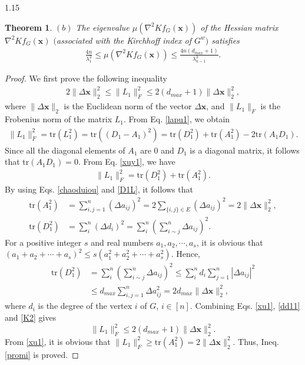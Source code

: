 \documentclass[preprint,12pt]{elsarticle1}
\newtheorem{thm}{Theorem}[section]
\numberwithin{equation}{section}
\begin{document}
\begin{spacing}{1.15}
\begin{thm}
$(b)$  The eigenvalue $\mu(\nabla^{2}Kf_{G}(\mathbf{x}))$ of the Hessian matrix $\nabla^{2}Kf_{G}(\mathbf{x})$ $($associated with the Kirchhoff index  of $G^{w}$$)$ satisfies
\begin{align}
\nonumber \frac{4n}{\lambda_{1}^{3}}\leq \mu(\nabla^{2}Kf_{G}(\mathbf{x}))\leq \frac{4n(d_{max}+1)}{\lambda_{n-1}^{3}}.\end{align}
\end{thm}
\begin{proof}
 We first prove the following inequality\begin{align}\label{promi}2\|\Delta \textbf{x}\|^{2}_{2}\leq\|L_{1}\|_{F}^{2}\leq2(d_{max}+1)\|\Delta \textbf{x}\|^{2}_{2},\end{align}
where $\|\Delta \textbf{x}\|_{2}$ is the Euclidean norm  of the vector $\Delta \textbf{x}$, and $\|L_{1}\|_{F}$ is the Frobenius norm of the matrix $L_{1}$.
From Eq. \eqref{lapu1}, we obtain\begin{equation}\label{xuy1}
    \begin{aligned}
\|L_{1}\|_{F}^{2}=\textrm{tr}(L^{2}_{1})=\textrm{tr}((D_{1}-A_{1})^{2})
=\textrm{tr}(D_{1}^{2})+
\textrm{tr}(A_{1}^{2})-2\textrm{tr}(A_{1}D_{1}).
\end{aligned}
\end{equation}
Since all the diagonal elements of $A_{1}$ are  0 and $D_{1}$ is a diagonal matrix, it follows that $\textrm{tr}(A_{1}D_{1})=0.$ From Eq. \eqref{xuy1}, we have
\begin{align}\label{xu1}
\|L_{1}\|_{F}^{2}=\textrm{tr}(D_{1}^{2})+
\textrm{tr}(A_{1}^{2}).
\end{align}
By using Eqs. \eqref{chaoduiou} and \eqref{D1L}, it follows that \begin{align}\label{dd11}
 \textrm{tr}(A_{1}^{2})&=\sum_{i,j=1}^{n}(\Delta a_{ij})^{2}
=2\sum_{\{i,j\}\in E}\left(\Delta a_{ij}\right)^{2}=2\|\Delta \textbf{x}\|^{2}_{2},\\ \nonumber
\textrm{tr}(D_{1}^{2})&=\sum_{i}^{n} \left(\Delta d_{i}\right)^{2}= \sum_{i}^{n}\left(\sum_{i\sim j}^{n} \Delta a_{ij}\right)^{2}
.\end{align}
For a positive integer $s$  and real numbers $a_{1},a_{2},\cdots,a_{s}$, it is obvious that $(a_{1}+a_{2}+\cdots+a_{s})^{2}\leq s(a_{1}^{2}+a_{2}^{2}+\cdots+a_{s}^{2})$. Hence,
\begin{align}\nonumber \textrm{tr}(D_{1}^{2})&= \sum_{i}^{n}\left(\sum_{i\sim j}^{n} \Delta a_{ij}\right)^{2}\leq
\sum_{i}^{n}d_{i}\sum_{j=1}^{n} |\Delta a_{ij}|^{2}\\ \label{K2}
&\leq d_{max}\sum_{i,j=1}^{n} \Delta a_{ij}^{2}=2d_{max}\|\Delta \textbf{x}\|^{2}_{2},
\end{align}
where $d_{i}$ is the degree of the vertex $i$ of $G$, $i\in[n].$
Combining Eqs. \eqref{xu1}, \eqref{dd11} and \eqref{K2} gives $$\|L_{1}\|_{F}^{2}\leq2(d_{max}+1)\|\Delta \textbf{x}\|^{2}_{2}.$$ From \eqref{xu1}, it is obvious that $\|L_{1}\|_{F}^{2}\geq \textrm{tr}(A_{1}^{2})=2\|\Delta \textbf{x}\|^{2}_{2}.$ Thus, Ineq. \eqref{promi} is proved.


\end{proof}
\end{spacing}
\end{document}
